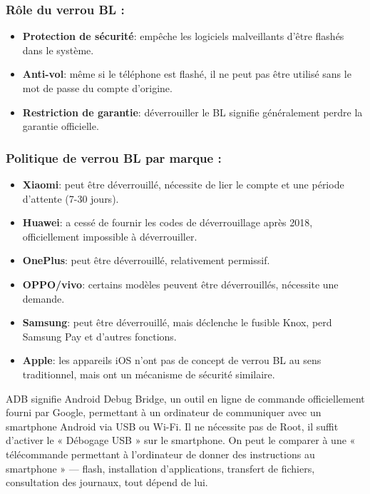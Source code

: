 \subsubsection*{Rôle du verrou BL :}

\begin{itemize}
  \item \textbf{Protection de sécurité}: empêche les logiciels malveillants d'être flashés dans le système.
  \item \textbf{Anti-vol}: même si le téléphone est flashé, il ne peut pas être utilisé sans le mot de passe du compte d'origine.
  \item \textbf{Restriction de garantie}: déverrouiller le BL signifie généralement perdre la garantie officielle.
\end{itemize}

\subsubsection*{Politique de verrou BL par marque :}

\begin{itemize}
  \item \textbf{Xiaomi}: peut être déverrouillé, nécessite de lier le compte et une période d'attente (7-30 jours).
  \item \textbf{Huawei}: a cessé de fournir les codes de déverrouillage après 2018, officiellement impossible à déverrouiller.
  \item \textbf{OnePlus}: peut être déverrouillé, relativement permissif.
  \item \textbf{OPPO/vivo}: certains modèles peuvent être déverrouillés, nécessite une demande.
  \item \textbf{Samsung}: peut être déverrouillé, mais déclenche le fusible Knox, perd Samsung Pay et d'autres fonctions.
  \item \textbf{Apple}: les appareils iOS n'ont pas de concept de verrou BL au sens traditionnel, mais ont un mécanisme de sécurité similaire.
\end{itemize}


ADB signifie Android Debug Bridge, un outil en ligne de commande officiellement fourni par Google, permettant à un ordinateur de communiquer avec un smartphone Android via USB ou Wi-Fi. Il ne nécessite pas de Root, il suffit d'activer le « Débogage USB » sur le smartphone. On peut le comparer à une « télécommande permettant à l'ordinateur de donner des instructions au smartphone » — flash, installation d'applications, transfert de fichiers, consultation des journaux, tout dépend de lui.


